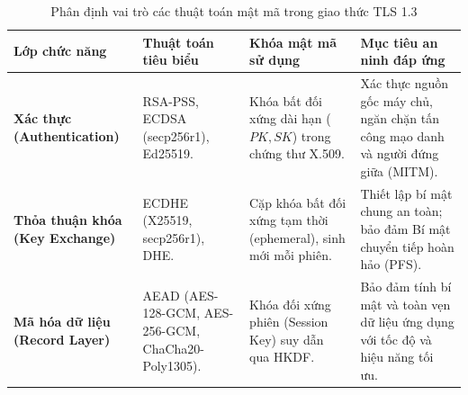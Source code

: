 \begin{table}[!htbp]
\centering
\caption{Phân định vai trò các thuật toán mật mã trong giao thức TLS 1.3}
\label{tab:tls_algorithms}
\small
\renewcommand{\arraystretch}{1.3}
\begin{tabularx}{\textwidth}{@{}>{\raggedright\arraybackslash}p{2.8cm} >{\raggedright\arraybackslash}p{3.2cm} >{\raggedright\arraybackslash}p{3.4cm} >{\raggedright\arraybackslash}X@{}}
\toprule
\textbf{Lớp chức năng} & \textbf{Thuật toán tiêu biểu} & \textbf{Khóa mật mã sử dụng} & \textbf{Mục tiêu an ninh đáp ứng} \\
\midrule
\textbf{Xác thực (Authentication)} & 
RSA-PSS, ECDSA (secp256r1), Ed25519. & 
Khóa bất đối xứng dài hạn ($PK, SK$) trong chứng thư X.509. & 
Xác thực nguồn gốc máy chủ, ngăn chặn tấn công mạo danh và người đứng giữa (MITM). \\
\midrule
\textbf{Thỏa thuận khóa (Key Exchange)} & 
ECDHE (X25519, secp256r1), DHE. & 
Cặp khóa bất đối xứng tạm thời (ephemeral), sinh mới mỗi phiên. & 
Thiết lập bí mật chung an toàn; bảo đảm Bí mật chuyển tiếp hoàn hảo (PFS). \\
\midrule
\textbf{Mã hóa dữ liệu (Record Layer)} & 
AEAD (AES-128-GCM, AES-256-GCM, ChaCha20-Poly1305). & 
Khóa đối xứng phiên (Session Key) suy dẫn qua HKDF. & 
Bảo đảm tính bí mật và toàn vẹn dữ liệu ứng dụng với tốc độ và hiệu năng tối ưu. \\
\bottomrule
\end{tabularx}
\end{table}
